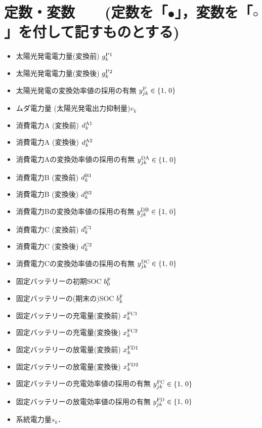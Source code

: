 \documentclass{jarticle}
\newcommand{\IB}{$\bullet$}
\newcommand{\IC}{$\circ$}
\begin{document}
\section{定数・変数 \mbox{\normalsize\rm 
~ (定数を「\IB」，変数を「\IC」を付して記すものとする)}}

 \begin{itemize}
  \item[\IB] 太陽光発電電力量(変換前) $g^{\rm P1}_{k}$
  \item[\IC] 太陽光発電電力量(変換後) $g^{\rm P2}_{k}$
  \item[\IC] 太陽光発電の変換効率値の採用の有無 $y^{\rm P}_{jk} \in \{1,\,0\}$
  \item[\IC] ムダ電力量 (太陽光発電出力抑制量)$v_{k}$ \\[-2.5ex]
  \item[\IC] 消費電力A (変換前) $d^{\rm A1}_{k}$
  \item[\IB] 消費電力A (変換後) $d^{\rm A2}_{k}$
  \item[\IC] 消費電力Aの変換効率値の採用の有無 $y^{\rm DA}_{jk} \in \{1,\,0\}$ \\[-2.5ex]
  \item[\IC] 消費電力B (変換前) $d^{\rm B1}_{k}$
  \item[\IB] 消費電力B (変換後) $d^{\rm B2}_{k}$
  \item[\IC] 消費電力Bの変換効率値の採用の有無 $y^{\rm DB}_{jk} \in \{1,\,0\}$ \\[-2.5ex]
  \item[\IC] 消費電力C (変換前) $d^{\rm C1}_{k}$
  \item[\IB] 消費電力C (変換後) $d^{\rm C2}_{k}$
  \item[\IC] 消費電力Cの変換効率値の採用の有無 $y^{\rm DC}_{jk} \in \{1,\,0\}$ \\[-2.5ex]
  \item[\IB] 固定バッテリーの初期SOC $b^{\rm F}_{0}$
  \item[\IC] 固定バッテリーの(期末の)SOC $b^{\rm F}_{k}$
  \item[\IC] 固定バッテリーの充電量(変換前) $x^{\rm FC1}_{k}$
  \item[\IC] 固定バッテリーの充電量(変換後) $x^{\rm FC2}_{k}$
  \item[\IC] 固定バッテリーの放電量(変換前) $x^{\rm FD1}_{k}$
  \item[\IC] 固定バッテリーの放電量(変換後) $x^{\rm FD2}_{k}$ \\[-2.5ex]
  \item[\IC] 固定バッテリーの充電効率値の採用の有無 $y^{\rm FC}_{jk} \in \{1,\,0\}$
  \item[\IC] 固定バッテリーの放電効率値の採用の有無 $y^{\rm FD}_{jk} \in \{1,\,0\}$ \\[-2.5ex]
  \item[\IC] 系統電力量$s_{k}$．
\end{itemize}
\end{document}

